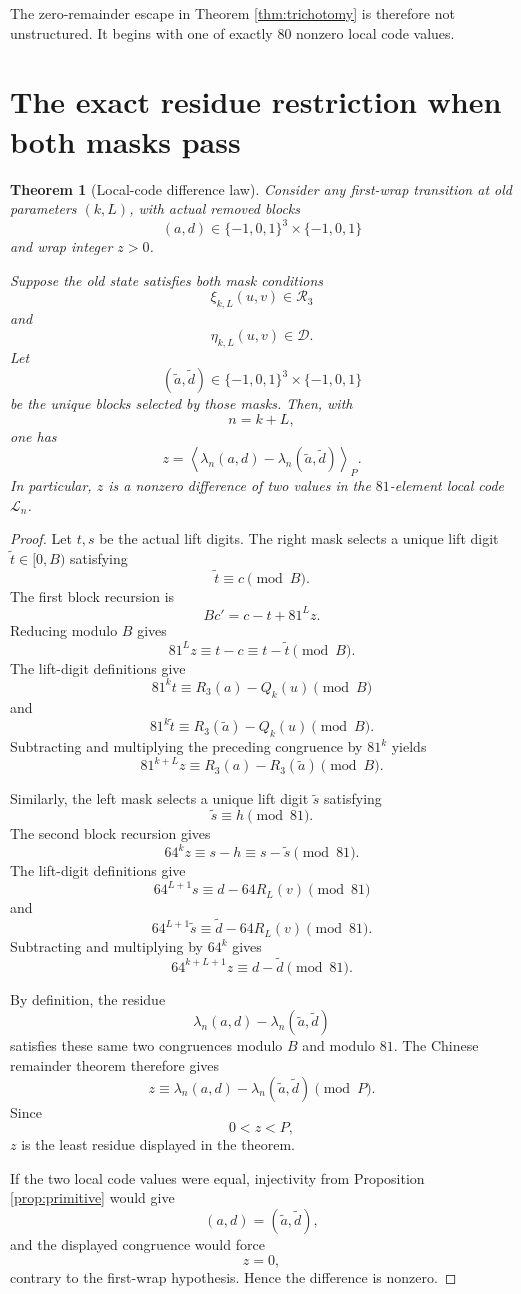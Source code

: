 \documentclass[11pt]{article}
\newtheorem{theorem}{Theorem}[section]
\theoremstyle{remark}
\newcommand{\E}{\{-1,0,1\}}
\newcommand{\Rset}{\mathcal{R}}
\newcommand{\Dset}{\mathcal{D}}
\newcommand{\Lset}{\mathcal{L}}
\newcommand{\res}[2]{\left\langle #1\right\rangle_{#2}}
\begin{document}
The zero-remainder escape in Theorem \ref{thm:trichotomy} is therefore not unstructured.  It begins with one of exactly \(80\) nonzero local code values.

\section{The exact residue restriction when both masks pass}

\begin{theorem}[Local-code difference law]
\label{thm:difference-law}
Consider any first-wrap transition at old parameters \((k,L)\), with actual removed blocks
\[
(a,d)\in\E^3\times\E
\]
and wrap integer \(z>0\).

Suppose the old state satisfies both mask conditions
\[
\xi_{k,L}(u,v)\in\Rset_3
\]
and
\[
\eta_{k,L}(u,v)\in\Dset.
\]
Let
\[
(\widetilde a,\widetilde d)\in\E^3\times\E
\]
be the unique blocks selected by those masks.  Then, with
\[
n=k+L,
\]
one has
\[
z=
\res{
\lambda_n(a,d)-\lambda_n(\widetilde a,\widetilde d)
}{P}.
\]
In particular, \(z\) is a nonzero difference of two values in the \(81\)-element local code \(\Lset_n\).
\end{theorem}

\begin{proof}
Let \(t,s\) be the actual lift digits.  The right mask selects a unique lift digit \(\widetilde t\in[0,B)\) satisfying
\[
\widetilde t\equiv c\pmod B.
\]
The first block recursion is
\[
Bc'=c-t+81^Lz.
\]
Reducing modulo \(B\) gives
\[
81^Lz\equiv t-c\equiv t-\widetilde t\pmod B.
\]
The lift-digit definitions give
\[
81^kt
\equiv
R_3(a)-Q_k(u)
\pmod B
\]
and
\[
81^k\widetilde t
\equiv
R_3(\widetilde a)-Q_k(u)
\pmod B.
\]
Subtracting and multiplying the preceding congruence by \(81^k\) yields
\[
81^{k+L}z
\equiv
R_3(a)-R_3(\widetilde a)
\pmod B.
\]

Similarly, the left mask selects a unique lift digit \(\widetilde s\) satisfying
\[
\widetilde s\equiv h\pmod{81}.
\]
The second block recursion gives
\[
64^kz\equiv s-h\equiv s-\widetilde s\pmod{81}.
\]
The lift-digit definitions give
\[
64^{L+1}s
\equiv
d-64R_L(v)
\pmod{81}
\]
and
\[
64^{L+1}\widetilde s
\equiv
\widetilde d-64R_L(v)
\pmod{81}.
\]
Subtracting and multiplying by \(64^k\) gives
\[
64^{k+L+1}z
\equiv
d-\widetilde d
\pmod{81}.
\]

By definition, the residue
\[
\lambda_n(a,d)-\lambda_n(\widetilde a,\widetilde d)
\]
satisfies these same two congruences modulo \(B\) and modulo \(81\).  The Chinese remainder theorem therefore gives
\[
z\equiv
\lambda_n(a,d)-\lambda_n(\widetilde a,\widetilde d)
\pmod P.
\]
Since
\[
0<z<P,
\]
\(z\) is the least residue displayed in the theorem.

If the two local code values were equal, injectivity from Proposition \ref{prop:primitive} would give
\[
(a,d)=(\widetilde a,\widetilde d),
\]
and the displayed congruence would force
\[
z=0,
\]
contrary to the first-wrap hypothesis.  Hence the difference is nonzero.
\end{proof}
\end{document}
